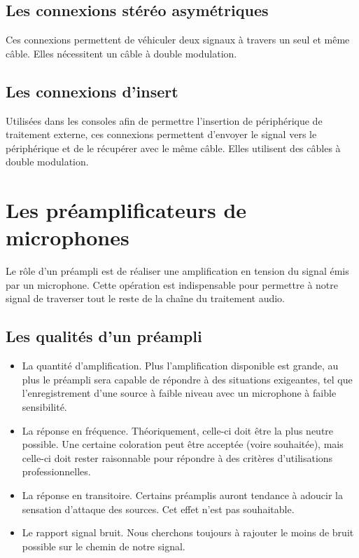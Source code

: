 \documentclass[
]{book}
\providecommand{\tightlist}{%
  \setlength{\itemsep}{0pt}\setlength{\parskip}{0pt}}
\begin{document}
\hypertarget{les-connexions-stuxe9ruxe9o-asymuxe9triques}{%
\section{Les connexions stéréo asymétriques}\label{les-connexions-stuxe9ruxe9o-asymuxe9triques}}

Ces connexions permettent de véhiculer deux signaux à travers un seul et même câble. Elles nécessitent un câble à double modulation.

\hypertarget{les-connexions-dinsert}{%
\section{Les connexions d'insert}\label{les-connexions-dinsert}}

Utilisées dans les consoles afin de permettre l'insertion de périphérique de traitement externe, ces connexions permettent d'envoyer le signal vers le périphérique et de le récupérer avec le même câble. Elles utilisent des câbles à double modulation.

\hypertarget{les-pruxe9amplificateurs-de-microphones}{%
\chapter{Les préamplificateurs de microphones}\label{les-pruxe9amplificateurs-de-microphones}}

Le rôle d'un préampli est de réaliser une amplification en tension du signal émis par un microphone. Cette opération est indispensable pour permettre à notre signal de traverser tout le reste de la chaîne du traitement audio.

\hypertarget{les-qualituxe9s-dun-pruxe9ampli}{%
\section{Les qualités d'un préampli}\label{les-qualituxe9s-dun-pruxe9ampli}}

\begin{itemize}
\tightlist
\item
  La quantité d'amplification. Plus l'amplification disponible est grande, au plus le préampli sera capable de répondre à des situations exigeantes, tel que l'enregistrement d'une source à faible niveau avec un microphone à faible sensibilité.
\item
  La réponse en fréquence. Théoriquement, celle-ci doit être la plus neutre possible. Une certaine coloration peut être acceptée (voire souhaitée), mais celle-ci doit rester raisonnable pour répondre à des critères d'utilisations professionnelles.
\item
  La réponse en transitoire. Certains préamplis auront tendance à adoucir la sensation d'attaque des sources. Cet effet n'est pas souhaitable.
\item
  Le rapport signal bruit. Nous cherchons toujours à rajouter le moins de bruit possible sur le chemin de notre signal.
\end{itemize}
\end{document}
